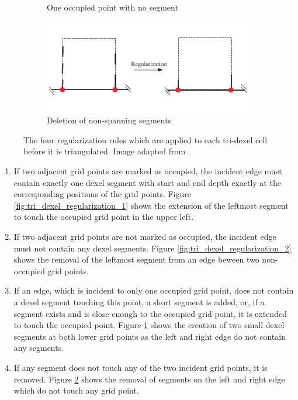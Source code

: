 \begin{figure}[h]
\begin{subfigure}[t]{0.45\textwidth}
		\caption{One occupied point with no segment}
		\label{fig:tri_dexel_regularization_3}
	\end{subfigure}
	\begin{subfigure}[t]{0.45\textwidth}
		\centering
		\includegraphics[width=\textwidth]{images/tri_dexel_regularization_4}
		\caption{Deletion of non-spanning segments}
		\label{fig:tri_dexel_regularization_4}
	\end{subfigure}
	\caption{
		The four regularization rules which are applied to each tri-dexel cell before it is triangulated.
		Image adapted from \cite{tridexel_reconstruction}.
	}
	\label{fig:tri_dexel_regularization}
\end{figure}

\begin{enumerate}
	\item If two adjacent grid points are marked as occupied, the incident edge must contain exactly one dexel segment with start and end depth exactly at the corresponding positions of the grid points.
	Figure \ref{fig:tri_dexel_regularization_1} shows the extension of the leftmost segment to touch the occupied grid point in the upper left.

	\item If two adjacent grid points are not marked as occupied, the incident edge must not contain any dexel segments.
	Figure \ref{fig:tri_dexel_regularization_2} shows the removal of the leftmost segment from an edge beween two non-occupied grid points.

	\item If an edge, which is incident to only one occupied grid point, does not contain a dexel segment touching this point, a short segment is added, or, if a segment exists and is close enough to the occupied grid point, it is extended to touch the occupied point.
	Figure \ref{fig:tri_dexel_regularization_3} shows the creation of two small dexel segments at both lower grid points as the left and right edge do not contain any segments.

	\item If any segment does not touch any of the two incident grid points, it is removed.
	Figure \ref{fig:tri_dexel_regularization_4} shows the removal of segments on the left and right edge which do not touch any grid point.
\end{enumerate}

